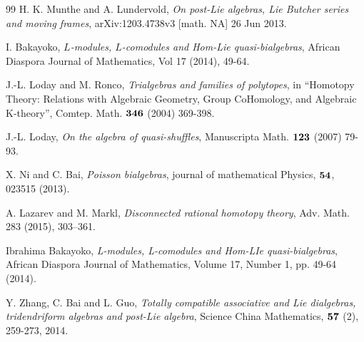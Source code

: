\documentclass{article}
\theoremstyle{definition}
\theoremstyle{remark}
\numberwithin{equation}{section}
\begin{document}
\begin{thebibliography}{99}
 H. K. Munthe   and A. Lundervold, {\it On post-Lie algebras, Lie Butcher series and moving frames}, arXiv:1203.4738v3 [math. NA] 26 Jun 2013.

  I. Bakayoko, {\it $L$-modules, $L$-comodules and Hom-Lie quasi-bialgebras},
African Diaspora Journal of Mathematics, Vol 17  (2014), 49-64.

 J.-L. Loday   and M. Ronco, {\it Trialgebras and families of polytopes}, in ``Homotopy Theory: Relations with
Algebraic Geometry, Group CoHomology, and Algebraic K-theory'', Comtep. Math. $\bf346$ (2004) 369-398.

 J.-L. Loday, {\it On the algebra of quasi-shuffles}, Manuscripta Math. $\bf 123$ (2007) 79-93.

 X. Ni  and C. Bai, {\it Poisson bialgebras}, journal of mathematical Physics, $\bf 54$, 023515 (2013).

 A. Lazarev and M. Markl, {\it Disconnected rational homotopy theory}, Adv. Math. 283 (2015), 303–361.

 Ibrahima Bakayoko, {\it L-modules, L-comodules and Hom-LIe quasi-bialgebras}, African Diaspora Journal of Mathematics, Volume 17, Number 1, pp. 49-64 (2014).

 Y. Zhang, C. Bai  and L. Guo, {\it Totally compatible associative and Lie dialgebras, tridendriform algebras and post-Lie algebra}, Science China Mathematics, $\bf 57$ (2), 259-273, 2014.
\end{thebibliography} 
\end{document}

